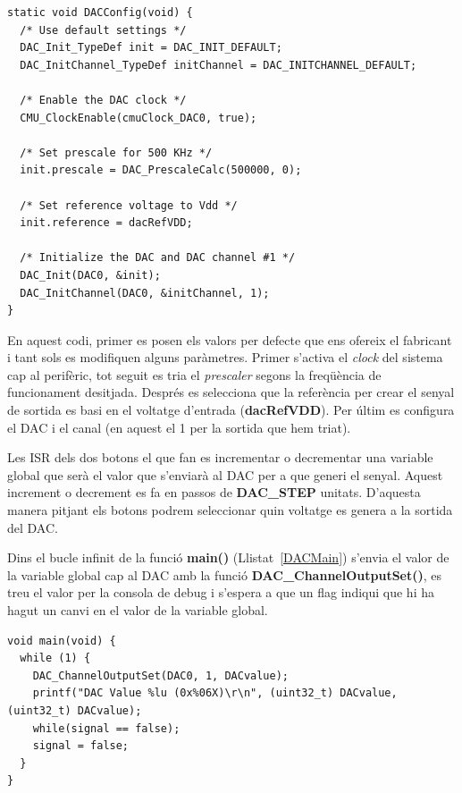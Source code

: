 \begin{lstlisting}[style=customc, caption=Inicialització del DAC, label=DACConfig]
static void DACConfig(void) {
  /* Use default settings */
  DAC_Init_TypeDef init = DAC_INIT_DEFAULT;
  DAC_InitChannel_TypeDef initChannel = DAC_INITCHANNEL_DEFAULT;

  /* Enable the DAC clock */
  CMU_ClockEnable(cmuClock_DAC0, true);

  /* Set prescale for 500 KHz */
  init.prescale = DAC_PrescaleCalc(500000, 0);

  /* Set reference voltage to Vdd */
  init.reference = dacRefVDD;

  /* Initialize the DAC and DAC channel #1 */
  DAC_Init(DAC0, &init);
  DAC_InitChannel(DAC0, &initChannel, 1);
}
\end{lstlisting}

En aquest codi, primer es posen els valors per defecte que ens ofereix el fabricant i tant sols es modifiquen alguns paràmetres. Primer s'activa el {\em clock} del sistema cap al perifèric, tot seguit es tria el {\em prescaler} segons la freqüència de funcionament desitjada.  Després es selecciona que la referència per crear el senyal de sortida es basi en el voltatge d'entrada ({\bf dacRefVDD}). Per últim es configura el DAC i el canal (en aquest el 1 per la sortida que hem triat).

Les \gls{ISR} dels dos botons el que fan es incrementar o decrementar una variable global que serà el valor que s'enviarà al DAC per a que generi el senyal. Aquest increment o decrement es fa en passos de {\bf DAC\_STEP} unitats. D'aquesta manera pitjant els botons podrem seleccionar quin voltatge es genera a la sortida del DAC.

Dins el bucle infinit de la funció {\bf main()} (Llistat~\ref{DACMain}) s'envia el valor de la variable global cap al DAC amb la funció {\bf DAC\_ChannelOutputSet()}, es treu el valor per la consola de debug i s'espera a que un \gls{flag} indiqui que hi ha hagut un canvi en el valor de la variable global.

\begin{lstlisting}[style=customc, caption=Bucle infinit del DAC, label=DACMain]
void main(void) {
  while (1) {
    DAC_ChannelOutputSet(DAC0, 1, DACvalue);
    printf("DAC Value %lu (0x%06X)\r\n", (uint32_t) DACvalue, (uint32_t) DACvalue);
    while(signal == false);
    signal = false;
  }
}
\end{lstlisting}

